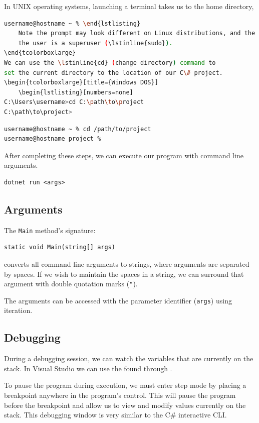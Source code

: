 \documentclass{article}
\def\customlinemarker#1#2{
    \edef\thelstnumber{%
        \unexpanded{%
            \ifnum#1=\value{lstnumber}\relax
              #2%
            \fi}%
        \ifx\thelstnumber\relax\else
        \expandafter\unexpanded\expandafter{\thelstnumber}%
        \fi
    }
}
\begin{document}
\begin{tcolorboxlarge}[title=UNIX]
    \vspace*{0.3cm}
    In UNIX operating systems, launching a terminal takes us to the home directory,
    \begin{lstlisting}[language=bash,numbers=none]
username@hostname ~ % \end{lstlisting}
    Note the prompt may look different on Linux distributions, and the \lstinline{%} may be replaced by a \lstinline{$} if
    the user is a superuser (\lstinline{sudo}).
\end{tcolorboxlarge}
We can use the \lstinline{cd} (change directory) command to
set the current directory to the location of our C\# project.
\begin{tcolorboxlarge}[title={Windows DOS}]
    \begin{lstlisting}[numbers=none]
C:\Users\username>cd C:\path\to\project
C:\path\to\project>\end{lstlisting}
\end{tcolorboxlarge}
\begin{tcolorboxlarge}[title=UNIX]
    \begin{lstlisting}[numbers=none]
username@hostname ~ % cd /path/to/project
username@hostname project %
\end{lstlisting}
\end{tcolorboxlarge}
After completing these steps, we can execute our program with command line arguments.
\begingroup
\let\thelstnumber\relax
\customlinemarker{1}{\$}
\begin{lstlisting}
dotnet run <args>
\end{lstlisting}
\endgroup
\subsection{Arguments}
The \lstinline{Main} method's signature:
\begin{lstlisting}[numbers=none]
static void Main(string[] args)
\end{lstlisting}
converts all command line arguments to strings,
where arguments are separated by spaces. If we wish to maintain the spaces
in a string, we can surround that argument with double quotation marks (\lstinline{"}). %

The arguments can be accessed with the parameter identifier (\lstinline{args})
using iteration.
\subsection{Debugging}
During a debugging session, we can watch the variables that are currently on the stack.
In Visual Studio we can use the  found through
.

To pause the program during execution, we must enter step mode by placing a breakpoint 
anywhere in the program's control. This will pause the program before the breakpoint 
and allow us to view and modify values currently on the stack. This debugging window
is very similar to the C\# interactive CLI. %
\end{document}

